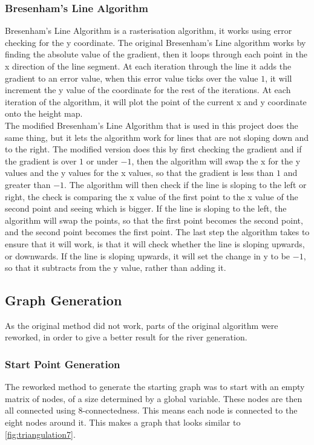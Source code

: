 \subsubsection{Bresenham's Line Algorithm}
	Bresenham's Line Algorithm is a rasterisation algorithm, it works using error checking for the y coordinate. The original Bresenham's Line algorithm works by finding the absolute value of the gradient, then it loops through each point in the x direction of the line segment. At each iteration through the line it adds the gradient to an error value, when this error value ticks over the value $1$, it will increment the y value of the coordinate for the rest of the iterations. At each iteration of the algorithm, it will plot the point of the current x and y coordinate onto the height map.\\
	The modified Bresenham's Line Algorithm that is used in this project does the same thing, but it lets the algorithm work for lines that are not sloping down and to the right. The modified version does this by first checking the gradient and if the gradient is over $1$ or under $-1$, then the algorithm will swap the x for the y values and the y values for the x values, so that the gradient is less than $1$ and greater than $-1$. The algorithm will then check if the line is sloping to the left or right, the check is comparing the x value of the first point to the x value of the second point and seeing which is bigger. If the line is sloping to the left, the algorithm will swap the points, so that the first point becomes the second point, and the second point becomes the first point. The last step the algorithm takes to ensure that it will work, is that it will check whether the line is sloping upwards, or downwards. If the line is sloping upwards, it will set the change in y to be $-1$, so that it subtracts from the y value, rather than adding it.


\subsection{Graph Generation}\label{subsec:graphGen}
	As the original method did not work, parts of the original algorithm were reworked, in order to give a better result for the river generation.

\subsubsection{Start Point Generation}
	The reworked method to generate the starting graph was to start with an empty matrix of nodes, of a size determined by a global variable. These nodes are then all connected using 8-connectedness. This means each node is connected to the eight nodes around it. This makes a graph that looks similar to \ref{fig:triangulation7}.

